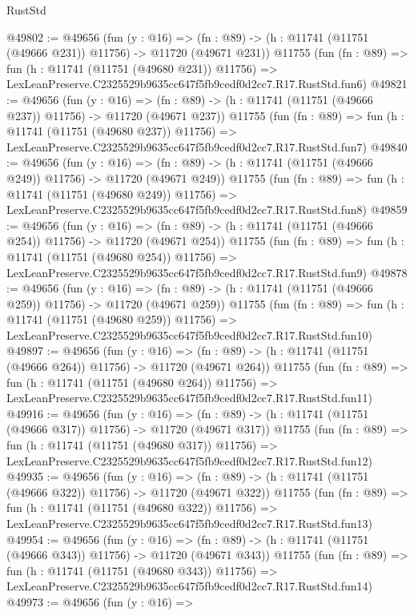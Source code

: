 \begin{lexlean}{RustStd}
\begin{coremodule}
@49802 := @49656
    (fun (y : @16) =>
    (fn : @89) -> (h : @11741 (@11751 (@49666 @231)) @11756) -> @11720 (@49671 @231))
    @11755
    (fun (fn : @89) =>
    fun (h : @11741 (@11751 (@49680 @231)) @11756) =>
    LexLeanPreserve.C2325529b9635cc647f5fb9cedf0d2cc7.R17.RustStd.fun6)
@49821 := @49656
    (fun (y : @16) =>
    (fn : @89) -> (h : @11741 (@11751 (@49666 @237)) @11756) -> @11720 (@49671 @237))
    @11755
    (fun (fn : @89) =>
    fun (h : @11741 (@11751 (@49680 @237)) @11756) =>
    LexLeanPreserve.C2325529b9635cc647f5fb9cedf0d2cc7.R17.RustStd.fun7)
@49840 := @49656
    (fun (y : @16) =>
    (fn : @89) -> (h : @11741 (@11751 (@49666 @249)) @11756) -> @11720 (@49671 @249))
    @11755
    (fun (fn : @89) =>
    fun (h : @11741 (@11751 (@49680 @249)) @11756) =>
    LexLeanPreserve.C2325529b9635cc647f5fb9cedf0d2cc7.R17.RustStd.fun8)
@49859 := @49656
    (fun (y : @16) =>
    (fn : @89) -> (h : @11741 (@11751 (@49666 @254)) @11756) -> @11720 (@49671 @254))
    @11755
    (fun (fn : @89) =>
    fun (h : @11741 (@11751 (@49680 @254)) @11756) =>
    LexLeanPreserve.C2325529b9635cc647f5fb9cedf0d2cc7.R17.RustStd.fun9)
@49878 := @49656
    (fun (y : @16) =>
    (fn : @89) -> (h : @11741 (@11751 (@49666 @259)) @11756) -> @11720 (@49671 @259))
    @11755
    (fun (fn : @89) =>
    fun (h : @11741 (@11751 (@49680 @259)) @11756) =>
    LexLeanPreserve.C2325529b9635cc647f5fb9cedf0d2cc7.R17.RustStd.fun10)
@49897 := @49656
    (fun (y : @16) =>
    (fn : @89) -> (h : @11741 (@11751 (@49666 @264)) @11756) -> @11720 (@49671 @264))
    @11755
    (fun (fn : @89) =>
    fun (h : @11741 (@11751 (@49680 @264)) @11756) =>
    LexLeanPreserve.C2325529b9635cc647f5fb9cedf0d2cc7.R17.RustStd.fun11)
@49916 := @49656
    (fun (y : @16) =>
    (fn : @89) -> (h : @11741 (@11751 (@49666 @317)) @11756) -> @11720 (@49671 @317))
    @11755
    (fun (fn : @89) =>
    fun (h : @11741 (@11751 (@49680 @317)) @11756) =>
    LexLeanPreserve.C2325529b9635cc647f5fb9cedf0d2cc7.R17.RustStd.fun12)
@49935 := @49656
    (fun (y : @16) =>
    (fn : @89) -> (h : @11741 (@11751 (@49666 @322)) @11756) -> @11720 (@49671 @322))
    @11755
    (fun (fn : @89) =>
    fun (h : @11741 (@11751 (@49680 @322)) @11756) =>
    LexLeanPreserve.C2325529b9635cc647f5fb9cedf0d2cc7.R17.RustStd.fun13)
@49954 := @49656
    (fun (y : @16) =>
    (fn : @89) -> (h : @11741 (@11751 (@49666 @343)) @11756) -> @11720 (@49671 @343))
    @11755
    (fun (fn : @89) =>
    fun (h : @11741 (@11751 (@49680 @343)) @11756) =>
    LexLeanPreserve.C2325529b9635cc647f5fb9cedf0d2cc7.R17.RustStd.fun14)
@49973 := @49656
    (fun (y : @16) =>

\end{coremodule}
\end{lexlean}
